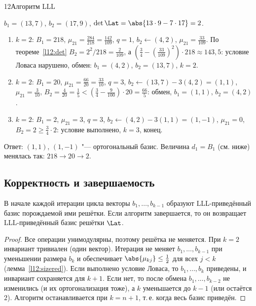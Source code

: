 \begin{lecture}{12}{Алгоритм LLL}
\begin{example}\label{l12:ex2d}
$b_1 = (13, 7)$, $b_2 = (17, 9)$, $\det \Lat = \abs{13 \cdot 9 - 7 \cdot 17} = 2$.
\begin{enumerate}
  \item $k = 2$: $B_1 = 218$, $\mu_{21} = \frac{284}{218} = \frac{142}{109}$, $q = 1$,
    $b_2 \gets (4, 2)$, $\mu_{21} = \frac{33}{109}$. По теореме~\ref{l12:det}
    $B_2 = 2^2 / 218 = \frac{2}{109}$, а
    $(\frac34 - (\frac{33}{109})^2) \cdot 218 \approx 143{,}5$: условие Ловаса нарушено, обмен:
    $b_1 = (4, 2)$, $b_2 = (13, 7)$, $k = 2$.
  \item $k = 2$: $B_1 = 20$, $\mu_{21} = \frac{66}{20} = \frac{33}{10}$, $q = 3$,
    $b_2 \gets (13, 7) - 3(4, 2) = (1, 1)$, $\mu_{21} = \frac{3}{10}$, $B_2 = \frac{4}{20} = \frac15
    < (\frac34 - \frac{9}{100}) \cdot 20 = \frac{66}{5}$: обмен, $b_1 = (1, 1)$, $b_2 = (4, 2)$.
  \item $k = 2$: $B_1 = 2$, $\mu_{21} = 3$, $q = 3$, $b_2 \gets (4, 2) - 3(1, 1) = (1, -1)$,
    $\mu_{21} = 0$, $B_2 = 2 \ge \frac34 \cdot 2$: условие выполнено, $k = 3$, конец.
\end{enumerate}
Ответ: $(1, 1)$, $(1, -1)$ "--- ортогональный базис. Величина $d_1 = B_1$ (см. ниже) менялась
так: $218 \to 20 \to 2$.
\end{example}


\subsection{Корректность и завершаемость}

\begin{lemma}\label{l12:invariant}
В начале каждой итерации цикла векторы $b_1, \dots, b_{k-1}$ образуют LLL-приведённый
базис порождаемой ими решётки. Если алгоритм завершается, то он возвращает LLL-приведённый
базис решётки $\Lat$.
\end{lemma}

\begin{proof}
Все операции унимодулярны, поэтому решётка не меняется. При $k = 2$ инвариант тривиален
(один вектор). Итерация не меняет $b_1, \dots, b_{k-1}$ при уменьшении размера $b_k$ и
обеспечивает $\abs{\mu_{kj}} \le \frac12$ для всех $j < k$ (лемма~\ref{l12:sizered}). Если
выполнено условие Ловаса, то $b_1, \dots, b_k$ приведены, и инвариант сохраняется для
$k + 1$. Если нет, то после обмена $b_1, \dots, b_{k-2}$ не изменились (и их
ортогонализация тоже), а $k$ уменьшается до $k - 1$ (или остаётся $2$). Алгоритм
останавливается при $k = n + 1$, т.\,е. когда весь базис приведён.
\end{proof}


\end{lecture}
